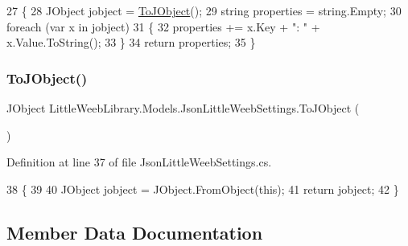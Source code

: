 \begin{DoxyCode}
27         \{
28             JObject jobject = \mbox{\hyperlink{class_little_weeb_library_1_1_models_1_1_json_little_weeb_settings_ae327fa558c554472183fb37a73ecb6de}{ToJObject}}();
29             \textcolor{keywordtype}{string} properties = \textcolor{keywordtype}{string}.Empty;
30             \textcolor{keywordflow}{foreach} (var x \textcolor{keywordflow}{in} jobject)
31             \{
32                 properties += x.Key + \textcolor{stringliteral}{": "} + x.Value.ToString();
33             \}
34             \textcolor{keywordflow}{return} properties;
35         \}
\end{DoxyCode}
\mbox{\label{class_little_weeb_library_1_1_models_1_1_json_little_weeb_settings_ae327fa558c554472183fb37a73ecb6de}} 
\subsubsection{\texorpdfstring{To\+J\+Object()}{ToJObject()}}
{\footnotesize\ttfamily J\+Object Little\+Weeb\+Library.\+Models.\+Json\+Little\+Weeb\+Settings.\+To\+J\+Object (\begin{DoxyParamCaption}{ }\end{DoxyParamCaption})}



Definition at line 37 of file Json\+Little\+Weeb\+Settings.\+cs.


\begin{DoxyCode}
38         \{
39 
40             JObject jobject = JObject.FromObject(\textcolor{keyword}{this});
41             \textcolor{keywordflow}{return} jobject;
42         \}
\end{DoxyCode}


\subsection{Member Data Documentation}
\mbox{\label{class_little_weeb_library_1_1_models_1_1_json_little_weeb_settings_a7129f2e6dce8f139b8875d5ff8cc2ddb}} 
